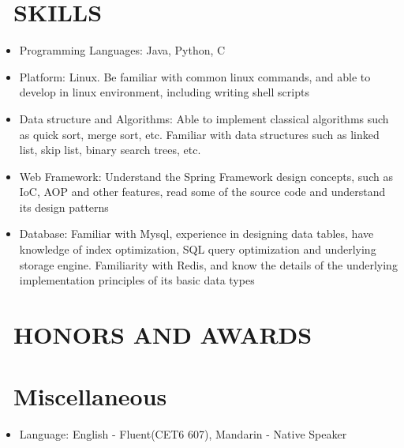 \documentclass{resume}
\begin{document}
\section{\faCogs\ SKILLS}
\begin{itemize}[parsep=0.5ex]
  \item Programming Languages: Java, Python, C
  \item Platform: Linux. Be familiar with common linux commands, and able to develop in linux environment, including writing shell scripts
  \item Data structure and Algorithms: Able to implement classical algorithms such as quick sort, merge sort, etc. Familiar with data structures such as linked list, skip list, binary search trees, etc.
  \item Web Framework: Understand the Spring Framework design concepts, such as IoC, AOP and other features, read some of the source code and understand its design patterns
  \item Database: Familiar with Mysql, experience in designing data tables, have knowledge of index optimization, SQL query optimization and underlying storage engine. Familiarity with Redis, and know the details of the underlying implementation principles of its basic data types
\end{itemize}

\section{\faHeartO\ HONORS AND AWARDS}

\section{\faInfo\ Miscellaneous}
\begin{itemize}[parsep=0.5ex]
  \item Language: English - Fluent(CET6 607), Mandarin - Native Speaker
\end{itemize}

%
%
\end{document}
